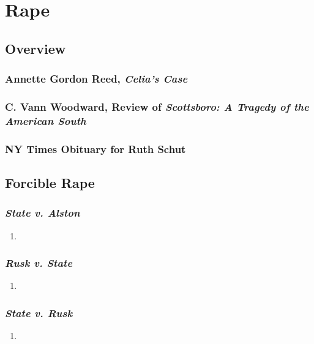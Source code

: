 \section{Rape}

\subsection{Overview}

\subsubsection{Annette Gordon Reed, \emph{Celia's Case}}

\subsubsection{C. Vann Woodward, Review of \emph{Scottsboro: A Tragedy of the American South}}

\subsubsection{NY Times Obituary for Ruth Schut}

\subsection{Forcible Rape}

\subsubsection{\emph{State v. Alston}}

\begin{enumerate}
    \item 
\end{enumerate}

\subsubsection{\emph{Rusk v. State}}

\begin{enumerate}
    \item 
\end{enumerate}

\subsubsection{\emph{State v. Rusk}}

\begin{enumerate}
    \item 
\end{enumerate}

